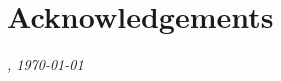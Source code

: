 \documentclass[\home/main.tex]{subfiles}
\begin{document}
	
\chapter{Acknowledgements}

\blindtext[2]

\vspace{1cm}

\begin{flushright}
\textit{\theauthor, \today}
\end{flushright}
\end{document}
